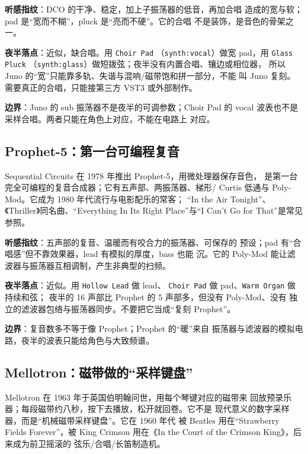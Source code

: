 \textbf{听感指纹}：DCO 的干净、稳定，加上子振荡器的低音，再加合唱
造成的宽与软；pad 是“宽而不糊”，pluck 是“亮而不硬”。它的合唱
不是装饰，是音色的骨架之一。

\textbf{夜半落点}：近似，缺合唱。用 \texttt{Choir Pad}
（\texttt{synth:vocal}）做宽 pad，用 \texttt{Glass Pluck}
（\texttt{synth:glass}）做短拨弦；夜半没有内置合唱、镶边或相位器，
所以 Juno 的“宽”只能靠多轨、失谐与混响/磁带饱和拼一部分，不能
叫 Juno 复刻。需要真正的合唱，只能接第三方 VST3 或外部制作。

\textbf{边界}：Juno 的 sub 振荡器不是夜半的可调参数；Choir Pad
的 vocal 波表也不是采样合唱。两者只能在角色上对应，不能在电路上
对应。

\subsection{Prophet-5：第一台可编程复音}
\label{sec:iconic-prophet}

Sequential Circuits 在 1978 年推出 Prophet-5，用微处理器保存音色，
是第一台完全可编程的复音合成器；它有五声部、两振荡器、梯形/ Curtis
低通与 Poly-Mod。它成为 1980 年代流行与电影配乐的常客；
“In the Air Tonight”、《Thriller》同名曲、“Everything In Its
Right Place”与“I Can't Go for That”是常见参照。

\textbf{听感指纹}：五声部的复音、温暖而有咬合力的振荡器、可保存的
预设；pad 有“合唱感”但不靠效果器，lead 有模拟的厚度，bass 也能
沉。它的 Poly-Mod 能让滤波器与振荡器互相调制，产生非典型的扫频。

\textbf{夜半落点}：近似。用 \texttt{Hollow Lead} 做 lead、
\texttt{Choir Pad} 做 pad、\texttt{Warm Organ} 做持续和弦；
夜半的 16 声部比 Prophet 的 5 声部多，但没有 Poly-Mod、没有
独立的滤波器包络与振荡器同步。不要把它当成“复刻 Prophet”。

\textbf{边界}：复音数多不等于像 Prophet；Prophet 的“暖”来自
振荡器与滤波器的模拟电路，夜半的波表只能给角色与大致频谱。

\subsection{Mellotron：磁带做的“采样键盘”}
\label{sec:iconic-mellotron}

Mellotron 在 1963 年于英国伯明翰问世，用每个琴键对应的磁带来
回放预录乐器；每段磁带约八秒，按下去播放，松开就回卷。它不是
现代意义的数字采样器，而是“机械磁带采样键盘”。它在 1960 年代
被 Beatles 用在“Strawberry Fields Forever”，被 King Crimson
用在《In the Court of the Crimson King》，后来成为前卫摇滚的
弦乐/合唱/长笛制造机。

